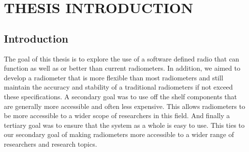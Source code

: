 \chapter{THESIS INTRODUCTION}




\section{Introduction}
The goal of this thesis is to explore the use of a software defined radio that can function as well as or better than current radiometers.  In addition, we aimed to develop a radiometer that is more flexible than most radiometers and still maintain the accuracy and stability of a traditional radiometers if not exceed these specifications.  A secondary goal was to use off the shelf components that are generally more accessible and often less expensive.  This allows radiometers to be more accessible to a wider scope of researchers in this field.  And finally a tertiary goal was to ensure that the system as a whole is easy to use.  This ties to our secondary goal of making radiometers more accessible to a wider range of researchers and research topics.

